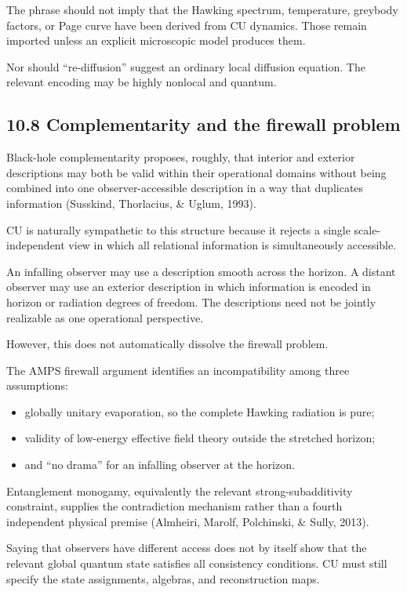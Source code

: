 \documentclass[
  11pt,
]{article}
\providecommand{\tightlist}{%
  \setlength{\itemsep}{0pt}\setlength{\parskip}{0pt}}
\begin{document}
The phrase should not imply that the Hawking spectrum, temperature,
greybody factors, or Page curve have been derived from CU dynamics.
Those remain imported unless an explicit microscopic model produces
them.

Nor should ``re-diffusion'' suggest an ordinary local diffusion
equation. The relevant encoding may be highly nonlocal and quantum.

\subsection{10.8 Complementarity and the firewall
problem}\label{complementarity-and-the-firewall-problem}

Black-hole complementarity proposes, roughly, that interior and exterior
descriptions may both be valid within their operational domains without
being combined into one observer-accessible description in a way that
duplicates information (Susskind, Thorlacius, \& Uglum, 1993).

CU is naturally sympathetic to this structure because it rejects a
single scale-independent view in which all relational information is
simultaneously accessible.

An infalling observer may use a description smooth across the horizon. A
distant observer may use an exterior description in which information is
encoded in horizon or radiation degrees of freedom. The descriptions
need not be jointly realizable as one operational perspective.

However, this does not automatically dissolve the firewall problem.

The AMPS firewall argument identifies an incompatibility among three
assumptions:

\begin{itemize}
\tightlist
\item
  globally unitary evaporation, so the complete Hawking radiation is
  pure;
\item
  validity of low-energy effective field theory outside the stretched
  horizon;
\item
  and ``no drama'' for an infalling observer at the horizon.
\end{itemize}

Entanglement monogamy, equivalently the relevant strong-subadditivity
constraint, supplies the contradiction mechanism rather than a fourth
independent physical premise (Almheiri, Marolf, Polchinski, \& Sully,
2013).

Saying that observers have different access does not by itself show that
the relevant global quantum state satisfies all consistency conditions.
CU must still specify the state assignments, algebras, and
reconstruction maps.
\end{document}
